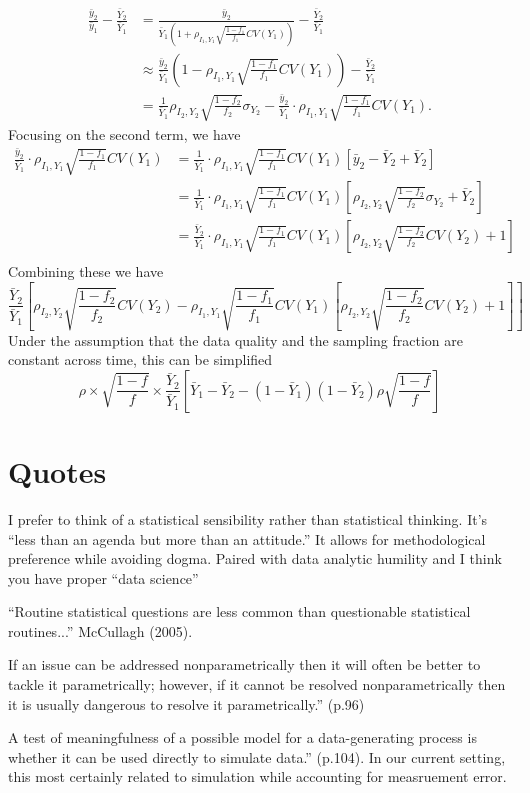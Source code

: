 \documentclass[11pt]{article}
\numberwithin{equation}{section}
\theoremstyle{plain}
\begin{document}
$$
\begin{aligned}
\frac{\bar y_2}{\bar y_1} - \frac{\bar Y_2}{\bar Y_1}
&= \frac{\bar y_2}{\bar Y_1  \left(1 + \rho_{I_1,Y_1} \sqrt{\frac{1-f_1}{f_1}} CV (Y_1) \right) } - \frac{\bar Y_2}{\bar Y_1}  \\
&\approx \frac{\bar y_2}{\bar Y_1} \left(1 - \rho_{I_1,Y_1} \sqrt{\frac{1-f_1}{f_1}} CV (Y_1) \right) - \frac{\bar Y_2}{\bar Y_1} \\
&= \frac{1}{\bar Y_1}  \rho_{I_2, Y_2} \sqrt{\frac{1-f_2}{f_2}} \sigma_{Y_2} - \frac{\bar y_2}{\bar Y_1} \cdot \rho_{I_1,Y_1} \sqrt{\frac{1-f_1}{f_1}} CV (Y_1).
\end{aligned}
$$
Focusing on the second term, we have
$$
\begin{aligned}
\frac{\bar y_2}{\bar Y_1} \cdot \rho_{I_1,Y_1} \sqrt{\frac{1-f_1}{f_1}} CV (Y_1) &= \frac{1}{\bar Y_1} \cdot \rho_{I_1,Y_1} \sqrt{\frac{1-f_1}{f_1}} CV (Y_1) \left[ \bar y_2 - \bar Y_2 + \bar Y_2 \right] \\
&= \frac{1}{\bar Y_1} \cdot \rho_{I_1,Y_1} \sqrt{\frac{1-f_1}{f_1}} CV (Y_1) \left[ \rho_{I_2, Y_2} \sqrt{\frac{1-f_2}{f_2}} \sigma_{Y_2} + \bar Y_2 \right] \\
&= \frac{\bar Y_2}{\bar Y_1} \cdot \rho_{I_1,Y_1} \sqrt{\frac{1-f_1}{f_1}} CV (Y_1) \left[ \rho_{I_2, Y_2} \sqrt{\frac{1-f_2}{f_2}} CV(Y_2) + 1 \right] \\
\end{aligned}
$$
Combining these we have
$$
\frac{\bar Y_2}{\bar Y_1} \left[ \rho_{I_2, Y_2} \sqrt{\frac{1-f_2}{f_2}} CV(Y_2)  - \rho_{I_1,Y_1} \sqrt{\frac{1-f_1}{f_1}} CV (Y_1) \left[ \rho_{I_2, Y_2} \sqrt{\frac{1-f_2}{f_2}} CV(Y_2) + 1 \right] \right]
$$
Under the assumption that the data quality and the sampling fraction are constant across time, this can be simplified
$$
\rho \times \sqrt{\frac{1-f}{f}} \times \frac{\bar Y_2}{\bar Y_1} \left[ \bar Y_1 - \bar Y_2 - (1-\bar Y_1)(1-\bar Y_2) \rho \sqrt{\frac{1-f}{f}} \right]
$$


\section{Quotes}

I prefer to think of a statistical sensibility rather than statistical thinking. It’s “less than an agenda but more than an attitude.”  It allows for methodological preference while avoiding dogma. Paired with data analytic humility and I think you have proper “data science”

“Routine statistical questions are less common than questionable statistical routines...” McCullagh (2005).

If an issue can be addressed nonparametrically then it will often be better to tackle it parametrically; however, if it cannot be resolved nonparametrically then it is usually dangerous to resolve it parametrically.” (p.96)

A test of meaningfulness of a possible model for a data-generating process is whether it can be used directly to simulate data.” (p.104).  In our current setting, this most certainly related to simulation while accounting for measruement error.
\end{document}
